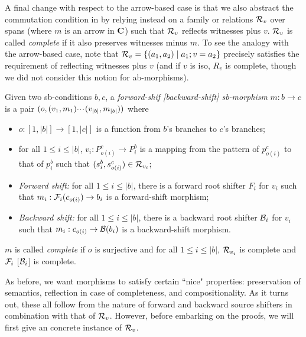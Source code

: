 A final change with respect to the arrow-based case is that we also abstract the commutation condition in  by relying instead on a family or relations $\mathcal{R}_v$ over spans (where $m$ is an arrow in $\mathbf{C}$) such that $\mathcal{R}_v$ reflects witnesses plus $v$. $\mathcal{R}_v$ is called \emph{complete} if it also preserves witnesses minus $m$. To see the analogy with the arrow-based case, note that $\mathcal{R}_v=\{{(a_1,a_2)\mid a_1;v=a_2}\}$ precisely satisfies the requirement of reflecting witnesses plus $v$ (and if $v$ is iso, $R_v$ is complete, though we did not consider this notion for ab-morphisms).
%
\begin{definition}
  Given two sb-conditions $b,c$, a \emph{forward-shif [backward-shift] sb-morphism} $m:b\to c$ is a pair $(o,(v_1,m_1){\cdotp\mkern-2mu\cdotp\mkern-2mu\cdotp\mkern1mu} (v_{|b|},m_{|b|}))$ where
  \begin{itemize}
  \item $o:[1,|b|]\to [1,|c|]$ is a function from $b$'s branches to $c$'s branches;
  \item for all $1\leq i\leq |b|$, $v_i:P^c_{o(i)}\to P^b_i$ is a mapping from the pattern of $p^c_{o(i)}$ to that of $p^b_i$ such that $(s^b_i,s^c_{o(i)})\in \mathcal{R}_{v_i}$;
  \item \emph{Forward shift:} for all $1\leq i\leq |b|$, there is a forward root shifter $F_i$ for $v_i$ such that $m_i:\mathcal{F}_i(c_{o(i)})\to b_i$ is a forward-shift morphism;
  \item \emph{Backward shift:} for all $1\leq i\leq |b|$, there is a backward root shifter $\mathcal{B}_i$ for $v_i$ such that $m_i:c_{o(i)}\to \mathcal{B}(b_i)$ is a backward-shift morphism.
  \end{itemize}
  $m$ is called \emph{complete} if $o$ is surjective and for all $1\leq i\leq |b|$, $\mathcal{R}_{v_i}$ is complete and $\mathcal{F}_i$ [$\mathcal{B}_i$] is complete.
\end{definition}
%
As before, we want morphisms to satisfy certain ``nice" properties: preservation of semantics, reflection in case of completeness, and compositionality. As it turns out, these all follow from the nature of forward and backward source shifters in combination with that of $\mathcal{R}_v$. However, before embarking on the proofs, we will first give an concrete instance of $\mathcal{R}_v$.


